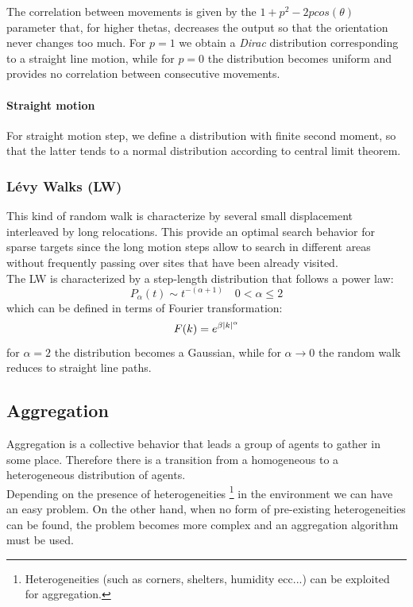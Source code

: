 \documentclass[10pt,a4paper]{article}
\begin{document}
The correlation between movements is given by the $1+p^2-2pcos(\theta)$ parameter that, for higher thetas, decreases the output so that the orientation never changes too  much.
For $p=1$ we obtain a \textit{Dirac} distribution corresponding to a straight line motion, while for $p=0$ the distribution becomes uniform and provides no correlation between consecutive movements.

\paragraph{Straight motion}
For straight motion step, we define a distribution with finite second moment, so that the latter tends to a normal distribution according to central limit theorem.



\subsubsection{Lévy Walks (LW)}
This kind of random walk is characterize by several small displacement interleaved by long relocations. This provide an optimal search behavior for sparse targets since the long motion steps allow to search in different areas without frequently passing over sites that have been already visited.\\
The LW is characterized by a step-length distribution that follows a power law:
\[P_{\alpha}(t)\sim t^{-(\alpha+1)}\quad 0<\alpha \le 2\]
which can be defined in terms of Fourier transformation:
\[F(k)=e^{\-\beta|k|^{\alpha}}\]
for $\alpha=2$ the distribution becomes a Gaussian, while for $\alpha \rightarrow 0$ the random walk reduces to straight line paths.



\subsection{Aggregation}


Aggregation is a collective behavior that leads a group of agents to gather in some place. Therefore there is a transition from a homogeneous to a heterogeneous distribution of agents.\\
Depending on the presence of heterogeneities  \footnote{Heterogeneities (such as corners, shelters, humidity ecc...) can be exploited for aggregation.} in the environment we can have an easy problem. On the other hand, when no form of pre-existing heterogeneities can be found, the problem becomes more complex and an aggregation algorithm must be used.\\
\end{document}
